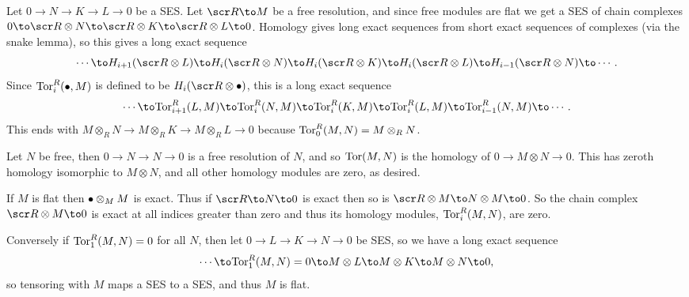 
    \item Let $0\to N\to K\to L\to0$ be a SES.
    Let $\R\to M$ be a free resolution, and since free modules are flat we get a SES of chain complexes $0\to\R\otimes N\to\R\otimes K\to\R\otimes L\to0$.
    Homology gives long exact sequences from short exact sequences of complexes (via the snake lemma), so this gives a long exact sequence
    $$ \cdots \to H_{i+1}(\R\otimes L) \to H_i(\R\otimes N) \to H_i(\R\otimes K) \to H_i(\R\otimes L) \to H_{i-1}(\R\otimes N) \to \cdots . $$
    Since ${\rm Tor}^R_i(\bullet,M)$ is defined to be $H_i(\R\otimes\bul)$, this is a long exact sequence
    $$ \cdots \to \tor^R_{i+1}(L,M) \to \tor^R_i(N,M) \to \tor^R_i(K,M) \to \tor^R_i(L,M) \to \tor^R_{i-1}(N,M) \to \cdots . $$
    This ends with $M\otimes_RN\to M\otimes_RK\to M\otimes_RL\to0$ because ${\rm Tor}^R_0(M,N)=M\otimes_RN$.

    \item Let $N$ be free, then $0\to N\to N\to0$ is a free resolution of $N$, and so ${\rm Tor}(M,N)$ is the homology of $0\to M\otimes N\to0$.
    This has zeroth homology isomorphic to $M\otimes N$, and all other homology modules are zero, as desired.

    \item If $M$ is flat then $\bullet\otimes_MM$ is exact.
    Thus if $\R\to N\to0$ is exact then so is $\R\otimes M\to N\otimes M\to0$.
    So the chain complex $\R\otimes M\to0$ is exact at all indices greater than zero and thus its homology modules, ${\rm Tor}^R_i(M,N)$, are zero.

    Conversely if ${\rm Tor}^R_1(M,N)=0$ for all $N$, then let $0\to L\to K\to N\to0$ be SES, so we have a long exact sequence
    $$ \cdots \to \tor^R_1(M,N) = 0 \to M\otimes L\to M\otimes K\to M\otimes N\to 0 , $$
    so tensoring with $M$ maps a SES to a SES, and thus $M$ is flat.
\eenum

\bye

